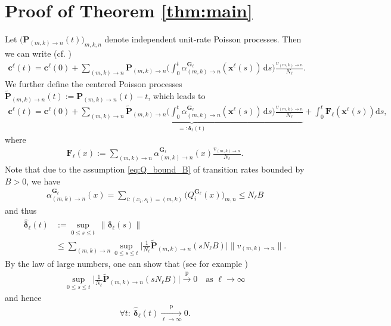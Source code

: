 \documentclass[a4paper,
               10pt,
               pdftex,
               normalheadings,
               headsepline,
               footsepline,
               headinclude,
               footinclude,
               DIV=14,
               abstracton]
{scrartcl}
\newcommand{\rv}[1]{\bm{#1}}
\newcommand{\toprob}{\overset{\mathrm{p}}{\longrightarrow}}
\newcommand{\diff}{\mathrm{d}}
\begin{document}
\section{Proof of Theorem \ref{thm:main}} \label{sec:appendix_proof_main}
Let $\big(\rv{P}_{(m,k)\to n}(t)\big)_{m,k,n}$ denote independent unit-rate Poisson processes. Then we can write (cf. \cite[section 1.2]{Winkelmann2020})
\begin{align}
    \rv{c}^\ell(t) = \rv{c}^\ell(0) + \sum_{(m,k)\to n} \rv{P}_{(m,k)\to n} \Big( \int_{0}^{t} \alpha_{(m,k)\to n}^{\rv{G}_\ell}(\rv{x}^\ell(s))\, \diff s\Big) \frac{v_{(m,k)\to n}}{N_\ell}.
\end{align}
We further define the centered Poisson processes $\rv{\tilde{P}}_{(m,k)\to n}(t) := \rv{P}_{(m,k)\to n}(t) - t$, which leads to
\begin{align}
    \rv{c}^\ell(t) = \rv{c}^\ell(0) + \underbrace{
    \sum_{(m,k)\to n} \rv{\tilde{P}}_{(m,k)\to n} \Big( \int_{0}^{t} \alpha_{(m,k)\to n}^{\rv{G}_\ell}(\rv{x}^\ell(s))\, \diff s\Big) \frac{v_{(m,k)\to n}}{N_\ell}
    }_{=: \rv{\delta}_{\ell}(t)} + \int_0^t \rv{F}_{\ell}(\rv{x}^\ell(s)) \diff s,
    \label{eq:rv_c}
\end{align}
where
\begin{align}
    \rv{F}_{\ell}(x) := \sum_{(m,k)\to n} \alpha_{(m,k)\to n}^{\rv{G}_\ell}(x) \frac{v_{(m,k)\to n}}{N_\ell}.
\end{align}
Note that due to the assumption \eqref{eq:Q_bound_B} of transition rates bounded by $B>0$, we have
\begin{align}
    \alpha^{\rv{G}_\ell}_{(m,k)\to n}(x) = \sum_{i: (x_i, s_i) = (m,k)} \big(Q_i^{\rv{G}_\ell}(x)\big)_{m, n} \leq N_\ell B
\end{align}
and thus
\begin{align}
    \hat{\rv{\delta}}_\ell(t) &:= \sup_{0 \leq s \leq t}\  \lVert \rv{\delta}_{\ell}(s) \rVert \\
    &\leq \sum_{(m,k)\to n} \sup_{0 \leq s \leq t} \Big\lvert \frac{1}{N_\ell} \rv{\tilde{P}}_{(m,k)\to n} (s N_\ell B) \Big\rvert \lVert v_{(m,k)\to n} \rVert. \label{eq:hat_delta}
\end{align}
By the law of large numbers, one can show that (see for example \cite[Theorem~1.2]{Anderson2011})
\begin{align}
    \sup_{0 \leq s \leq t} \big\lvert \frac{1}{N_\ell} \rv{\tilde{P}}_{(m,k)\to n} (s N_\ell B) \big\rvert \toprob 0 \quad \text{as } \ell \to \infty
\end{align}
 and hence
\begin{align}
     \forall t:\ \hat{\rv{\delta}}_\ell(t) \underset{\ell \to \infty}{\toprob} 0.
     \label{eq:delta_conv}
\end{align}
\end{document}

